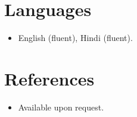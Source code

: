 \documentclass[11pt,a4paper,sans]{moderncv}
\begin{document}

\section{Languages}
\vspace{1pt}
\begin{itemize}
\item {English (fluent), Hindi (fluent).}
\end{itemize}


\section{References}
\vspace{1pt}
\begin{itemize}
\item{Available upon request.}
\end{itemize}
\end{document}
